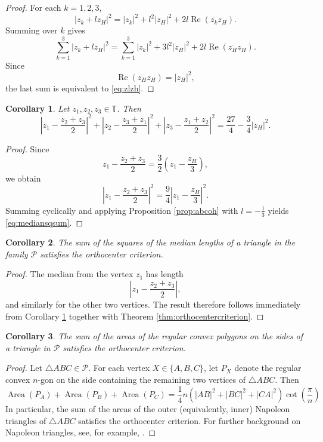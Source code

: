 \documentclass[11pt,reqno]{amsart}
\newtheorem{corollary}{Corollary}[section]
\theoremstyle{definition}
\numberwithin{equation}{section}
\begin{document}
\begin{proof}
For each $k=1,2,3$,
\[
|z_k+lz_H|^2
=
|z_k|^2+l^2|z_H|^2
+
2l\operatorname{Re}(\overline{z_k}z_H).
\]
Summing over $k$ gives
\[
\sum_{k=1}^3|z_k+lz_H|^2
=
\sum_{k=1}^3|z_k|^2
+
3l^2|z_H|^2
+
2l\operatorname{Re}\left(\overline{z_H}z_H\right).
\]
Since
\[
\operatorname{Re}(\overline{z_H}z_H)
=
|z_H|^2,
\]
the last sum is equivalent to \eqref{eq:zlzh}.
\end{proof}

\begin{corollary}\label{cor:mediansqsum}
Let $z_1,z_2,z_3\in\mathbb T$. Then
\begin{equation}\label{eq:mediansqsum}
\left|z_1-\frac{z_2+z_3}{2}\right|^2
+
\left|z_2-\frac{z_3+z_1}{2}\right|^2
+
\left|z_3-\frac{z_1+z_2}{2}\right|^2
=
\frac{27}{4}-\frac34|z_H|^2.
\end{equation}
\end{corollary}

\begin{proof}
Since
\[
z_1-\frac{z_2+z_3}{2}
=
\frac32\left(z_1-\frac{z_H}{3}\right),
\]
we obtain
\[
\left|z_1-\frac{z_2+z_3}{2}\right|^2
=
\frac94
\left|z_1-\frac{z_H}{3}\right|^2.
\]
Summing cyclically and applying Proposition \ref{prop:abcoh} with $l=-\frac13$ yields \eqref{eq:mediansqsum}.
\end{proof}

\begin{corollary}
The sum of the squares of the median lengths of a triangle in the family $\mathcal P$ satisfies the orthocenter criterion.
\end{corollary}

\begin{proof}
The median from the vertex $z_1$ has length
\[
\left|z_1-\frac{z_2+z_3}{2}\right|,
\]
and similarly for the other two vertices. The result therefore follows immediately from Corollary \ref{cor:mediansqsum} together with Theorem \ref{thm:orthocentercriterion}.
\end{proof}

\begin{corollary}
The sum of the areas of the regular convex polygons on the sides of a triangle in $\mathcal P$ satisfies the orthocenter criterion.
\end{corollary}
\begin{proof} Let $\triangle ABC \in \mathcal P$. For each vertex $X \in \{A,B,C\}$, let $P_X$ denote the regular convex $n$-gon on the side containing the remaining two vertices of $\triangle ABC$. Then
\[
\operatorname{Area}(P_A)+\operatorname{Area}(P_B)+\operatorname{Area}(P_C)=\frac{1}{4}n\left(|AB|^2+|BC|^2+|CA|^2\right)\cot\left(\frac{\pi}{n}\right)
\]
In particular, the sum of the areas of the outer (equivalently, inner) Napoleon triangles of $\triangle ABC$ satisfies the orthocenter criterion. For further background on Napoleon triangles, see, for example, \cite{Hahn2019}.
\end{proof}
\end{document}
